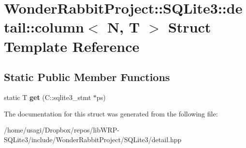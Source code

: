 \hypertarget{structWonderRabbitProject_1_1SQLite3_1_1detail_1_1column}{\section{Wonder\-Rabbit\-Project\-:\-:S\-Q\-Lite3\-:\-:detail\-:\-:column$<$ N, T $>$ Struct Template Reference}
\label{structWonderRabbitProject_1_1SQLite3_1_1detail_1_1column}
}
\subsection*{Static Public Member Functions}
\begin{DoxyCompactItemize}
\item 
\hypertarget{structWonderRabbitProject_1_1SQLite3_1_1detail_1_1column_a624660163c5bdd7855cfde9105bd2110}{static T {\bfseries get} (C\-::sqlite3\-\_\-stmt $\ast$ps)}\label{structWonderRabbitProject_1_1SQLite3_1_1detail_1_1column_a624660163c5bdd7855cfde9105bd2110}

\end{DoxyCompactItemize}


The documentation for this struct was generated from the following file\-:\begin{DoxyCompactItemize}
\item 
/home/usagi/\-Dropbox/repos/lib\-W\-R\-P-\/\-S\-Q\-Lite3/include/\-Wonder\-Rabbit\-Project/\-S\-Q\-Lite3/detail.\-hpp\end{DoxyCompactItemize}
